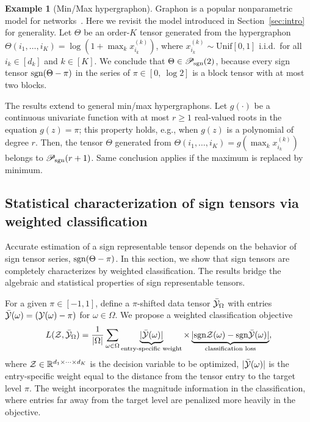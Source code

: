 \documentclass{article}
\theoremstyle{plain}
\theoremstyle{definition}
\newtheorem{example}{Example}
\newcommand*{\KeepStyleUnderBrace}[1]{%
  \mathop{%
    \mathchoice
    {\underbrace{\displaystyle#1}}%
    {\underbrace{\textstyle#1}}%
    {\underbrace{\scriptstyle#1}}%
    {\underbrace{\scriptscriptstyle#1}}%
  }\limits
}
\def\sign{\textup{sgn}}
\def\caliP{\mathscr{P}_{\textup{sgn}}}
\begin{document}
\begin{example}[Min/Max hypergraphon] Graphon is a popular nonparametric model for networks~\cite{chan2014consistent,xu2018rates}. Here we revisit the model introduced in Section~\ref{sec:intro} for generality. Let $\Theta$ be an order-$K$ tensor generated from the hypergraphon $\Theta(i_1,\ldots,i_K)=\log(1+\max_kx^{(k)}_{i_k})$, where $x^{(k)}_{i_k}\sim \text{Unif}[0,1]$ i.i.d.\ for all $i_k\in[d_k]$ and $k\in[K]$. We conclude that $\Theta \in \caliP(2)$, because every sign tensor $\sign(\Theta-\pi)$ in the series of $\pi\in[0,\ \log 2]$ is a block tensor with at most two blocks.

The results extend to general min/max hypergraphons. Let $g(\cdot)$ be a continuous univariate function with at most $r\geq 1$ real-valued roots in the equation $g(z)=\pi$; this property holds, e.g., when $g(z)$ is a polynomial of degree $r$. Then, the tensor $\Theta$ generated from $\Theta(i_1,\ldots,i_K)=g(\max_kx^{(k)}_{i_k})$ belongs to $\caliP(r+1)$. Same conclusion applies if the maximum is replaced by minimum.
\end{example}

\subsection{Statistical characterization of sign tensors via weighted classification}\label{sec:identifiability}

Accurate estimation of a sign representable tensor depends on the behavior of sign tensor series, $\sign(\Theta-\pi)$. In this section, we show that sign tensors are completely characterizes by weighted classification. The results bridge the algebraic and statistical properties of sign representable tensors.
 
For a given $\pi \in [-1,1]$, define a $\pi$-shifted data tensor $\bar {\mathcal{Y}}_\Omega$ with entries $\bar {\mathcal{Y}}(\omega) = (\mathcal{Y}(\omega)-\pi)$ for $\omega\in \Omega$. We propose a weighted classification objective
\begin{equation}\label{eq:sample}
L(\tZ, \bar \tY_\Omega)= {1\over |\Omega|}\sum_{\omega \in \Omega}\KeepStyleUnderBrace{|\bar \tY(\omega)|}_{\text{entry-specific weight}} \times \KeepStyleUnderBrace{| \sign \tZ(\omega)-\sign \bar \tY(\omega)|}_{\text{classification loss}},
\end{equation}
where $\mathcal{Z}\in\mathbb{R}^{d_1\times \cdots \times d_K}$ is the decision variable to be optimized, $|\bar {\mathcal{Y}}(\omega)|$ is the entry-specific weight equal to the distance from the tensor entry to the target level $\pi$. The weight incorporates the magnitude information in the classification, where entries far away from the target level are penalized more heavily in the objective. 
\end{document}
